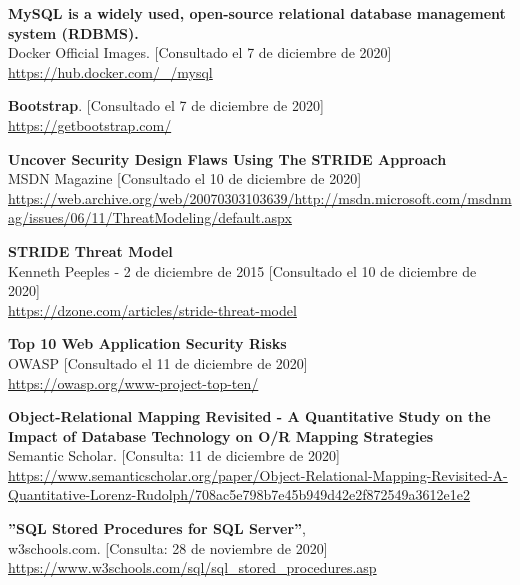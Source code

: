 \documentclass[a4paper,oneside]{article}
\begin{document}
\begin{thebibliography}{9}
	\textbf{MySQL is a widely used, open-source relational database management system (RDBMS).}\\
	Docker Official Images. [Consultado el 7 de diciembre de 2020]\\
	\url{https://hub.docker.com/_/mysql}
	
	\textbf{Bootstrap}. [Consultado el 7 de diciembre de 2020]\\
	\url{https://getbootstrap.com/}

	\textbf{Uncover Security Design Flaws Using The STRIDE Approach}\\
	MSDN Magazine [Consultado el 10 de diciembre de 2020]\\
	\url{https://web.archive.org/web/20070303103639/http://msdn.microsoft.com/msdnmag/issues/06/11/ThreatModeling/default.aspx}

	\textbf{STRIDE Threat Model}\\
	Kenneth Peeples - 2 de diciembre de 2015 [Consultado el 10 de diciembre de 2020]\\
	\url{https://dzone.com/articles/stride-threat-model}

	\textbf{Top 10 Web Application Security Risks}\\
	OWASP [Consultado el 11 de diciembre de 2020]\\
	\url{https://owasp.org/www-project-top-ten/}

	\textbf{Object-Relational Mapping Revisited - A Quantitative Study on the Impact of Database Technology on O/R Mapping Strategies}\\
	Semantic Scholar. [Consulta: 11 de diciembre de 2020]\\
	\url{https://www.semanticscholar.org/paper/Object-Relational-Mapping-Revisited-A-Quantitative-Lorenz-Rudolph/708ac5e798b7e45b949d42e2f872549a3612e1e2}

  \textbf{''SQL Stored Procedures for SQL Server''}, \\
  w3schools.com. [Consulta: 28 de noviembre de 2020]\\
  \url{https://www.w3schools.com/sql/sql_stored_procedures.asp}

\end{thebibliography}
\end{document}
